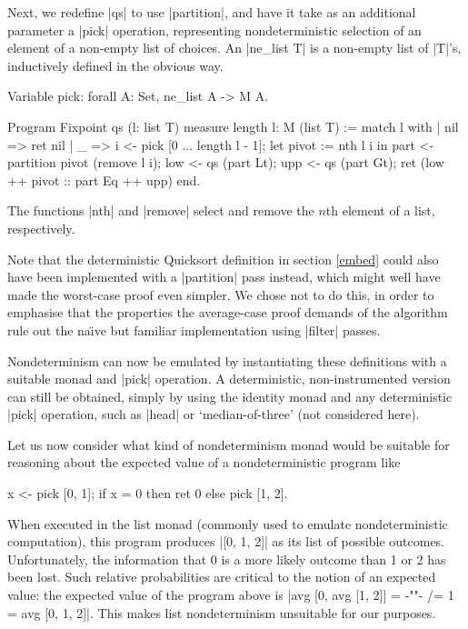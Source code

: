 \documentclass[runningheads]{llncs}
\begin{document}
Next, we redefine |qs| to use |partition|, and have it take as an additional parameter a |pick| operation, representing nondeterministic selection of an element of a non-empty list of choices. An |ne_list T| is a non-empty list of |T|'s, inductively defined in the obvious way. 

\begin{code}
  Variable pick: forall A: Set, ne_list A -> M A.

  Program Fixpoint qs (l: list T) {measure length l}: M (list T) :=
    match l with
    | nil => ret nil
    | _ =>
        i <- pick [0 ... length l - 1];
        let pivot := nth l i in
        part <- partition pivot (remove l i);
        low <- qs (part Lt);
        upp <- qs (part Gt);
        ret (low ++ pivot :: part Eq ++ upp)
    end.
\end{code}
The functions |nth| and |remove| select and remove the $n$th element of a list, respectively.

Note that the deterministic Quicksort definition in section \ref{embed} could also have been implemented with a |partition| pass instead, which might well have made the worst-case proof even simpler. We chose not to do this, in order to emphasise that the properties the average-case proof demands of the algorithm rule out the na{\"\i}ve but familiar implementation using |filter| passes.

Nondeterminism can now be emulated by instantiating these definitions with a suitable monad and |pick| operation. A deterministic, non-instrumented version can still be obtained, simply by using the identity monad and any deterministic |pick| operation, such as |head| or `median-of-three' (not considered here).

Let us now consider what kind of nondeterminism monad would be suitable for reasoning about the expected value of a nondeterministic program like
\begin{code}
  x <- pick [0, 1]; if x = 0 then ret 0 else pick [1, 2].
\end{code}
When executed in the list monad (commonly used to emulate nondeterministic computation), this program
produces |[0, 1, 2]| as its list of possible outcomes. Unfortunately, the information that 0 is a more likely outcome than 1 or 2 has been lost. Such relative probabilities are critical to the notion of an expected value: the expected value of the program above is |avg [0, avg [1, 2]] = {-""-} /= 1 = avg [0, 1, 2]|. This makes list nondeterminism unsuitable for our purposes.
\end{document}

